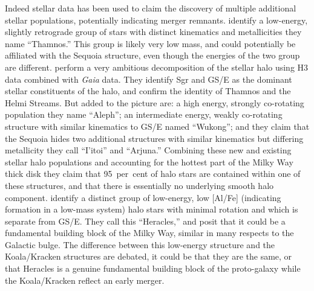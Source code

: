 Indeed stellar data has been used to claim the discovery of multiple additional stellar populations, potentially indicating merger remnants. \textcite{koppelman19b} identify a low-energy, slightly retrograde group of stars with distinct kinematics and metallicities they name ``Thamnos.'' This group is likely very low mass, and could potentially be affiliated with the Sequoia structure, even though the energies of the two group are different. \textcite{naidu20} perform a very ambitious decomposition of the stellar halo using H3 data combined with \textit{Gaia} data. They identify Sgr and GS/E as the dominant stellar constituents of the halo, and confirm the identity of Thamnos and the Helmi Streams. But added to the picture are: a high energy, strongly co-rotating population they name ``Aleph''; an intermediate energy, weakly co-rotating structure with similar kinematics to GS/E named ``Wukong''; and they claim that the Sequoia hides two additional structures with similar kinematics but differing metallicity they call ``I'itoi'' and ``Arjuna.'' Combining these new and existing stellar halo populations and accounting for the hottest part of the Milky Way thick disk they claim that 95~per~cent of halo stars are contained within one of these structures, and that there is essentially no underlying smooth halo component. \textcite{horta21a} identify a distinct group of low-energy, low [Al/Fe] (indicating formation in a low-mass system) halo stars with minimal rotation and which is separate from GS/E. They call this ``Heracles,'' and posit that it could be a fundamental building block of the Milky Way, similar in many respects to the Galactic bulge. The difference between this low-energy structure and the Koala/Kracken structures are debated, it could be that they are the same, or that Heracles is a genuine fundamental building block of the proto-galaxy while the Koala/Kracken reflect an early merger.

